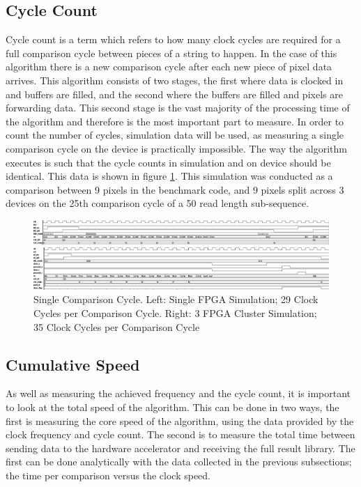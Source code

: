 \subsection{Cycle Count}
Cycle count is a term which refers to how many clock cycles are required for a full comparison cycle between pieces of a string to happen. In the case of this algorithm there is a new comparison cycle after each new piece of pixel data arrives. This algorithm consists of two stages, the first where data is clocked in and buffers are filled, and the second where the buffers are filled and pixels are forwarding data. This second stage is the vast majority of the  processing time of the algorithm and therefore is the most important part to measure. In order to count the number of cycles, simulation data will be used, as measuring a single comparison cycle on the device is practically impossible. The way the algorithm executes is such that the cycle counts in simulation and on device should be identical. This data is shown in figure \ref{fig:wave}. This simulation was conducted as a comparison between 9 pixels in the benchmark code, and 9 pixels split across 3 devices on the 25th comparison cycle of a 50 read length sub-sequence.

\begin{figure}
  \centering
  \includegraphics[width=\textheight]{./figs/provided.png} 
  \vspace*{4em}
 
   \includegraphics[width=\textheight]{./figs/MFPGA.png}
  \caption{Single Comparison Cycle. Left: Single FPGA Simulation; 29 Clock Cycles per Comparison Cycle. Right: 3 FPGA Cluster Simulation; 35 Clock Cycles per Comparison Cycle}
  \label{fig:wave}
\end{figure}

\subsection{Cumulative Speed}
As well as measuring the achieved frequency and the cycle count, it is important to look at the total speed of the algorithm. This can be done in two ways, the first is measuring the core speed of the algorithm, using the data provided by the clock frequency and cycle count. The second is to measure the total time between sending data to the hardware accelerator and receiving the full result library. The first can be done analytically with the data collected in the previous subsections; the time per comparison versus the clock speed.

